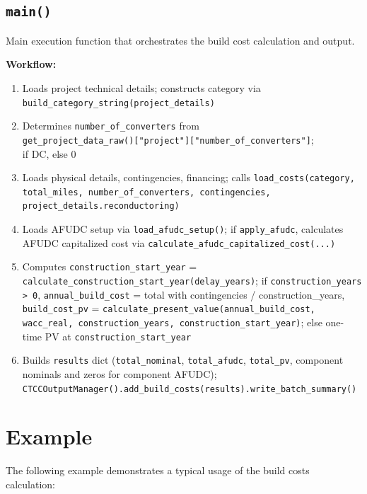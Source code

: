 \documentclass[ctcc_full_documentation.tex]{subfiles}
\begin{document}
\subsection{\texttt{main()}}

Main execution function that orchestrates the build cost calculation and output.

\textbf{Workflow:}
\begin{enumerate}
    \item Loads project technical details; constructs category via \texttt{build\_category\_string(project\_details)}
    \item Determines \texttt{number\_of\_converters} from\\
    \texttt{get\_project\_data\_raw()["project"]["number\_of\_converters"]};\\
    if DC, else 0
    \item Loads physical details, contingencies, financing; calls \texttt{load\_costs(category, total\_miles, number\_of\_converters, contingencies, project\_details.reconductoring)}
    \item Loads AFUDC setup via \texttt{load\_afudc\_setup()}; if \texttt{apply\_afudc}, calculates AFUDC capitalized cost via \texttt{calculate\_afudc\_capitalized\_cost(...)}
    \item Computes \texttt{construction\_start\_year} = \texttt{calculate\_construction\_start\_year(delay\_years)}; if \texttt{construction\_years > 0}, \texttt{annual\_build\_cost} = total with contingencies / construction\_years, \texttt{build\_cost\_pv} = \texttt{calculate\_present\_value(annual\_build\_cost, wacc\_real, construction\_years, construction\_start\_year)}; else one-time PV at \texttt{construction\_start\_year}
    \item Builds \texttt{results} dict (\texttt{total\_nominal}, \texttt{total\_afudc}, \texttt{total\_pv}, component nominals and zeros for component AFUDC); \texttt{CTCCOutputManager().add\_build\_costs(results).write\_batch\_summary()}
\end{enumerate}

\section{Example}

The following example demonstrates a typical usage of the build costs calculation:
\end{document}
